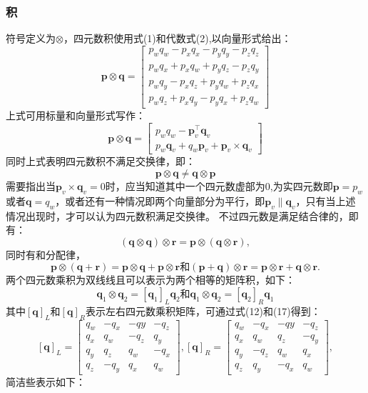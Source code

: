 \documentclass{article}
\begin{document}
\subsubsection{积}
符号定义为$\otimes$，四元数积使用式(1)和代数式(2),以向量形式给出：
$$
\textbf{p}\otimes \textbf{q} = \begin{bmatrix}p_wq_w-p_xq_x-p_yq_y-p_zq_z\\p_wq_x+p_xq_w+p_yq_z-p_zq_y\\
p_wq_y-p_xq_z+p_yq_w+p_zq_x\\
p_wq_z+p_xq_y-p_yq_x+p_zq_w\end{bmatrix}
$$上式可用标量和向量形式写作：
$$
\textbf{p}\otimes\textbf{q} = \begin{bmatrix}
p_wq_w-\textbf{p}_{v}^{\top}\textbf{q}_v\\
p_w\textbf{q}_v+q_w\textbf{p}_v+\textbf{p}_v\times\textbf{q}_v\end{bmatrix}
$$同时上式表明四元数积不满足交换律，即：
$$
\textbf{p}\otimes\textbf{q}\neq\textbf{q}\otimes\textbf{p}  
$$
需要指出当$\textbf{p}_v\times\textbf{q}_v=0$时，应当知道其中一个四元数虚部为0,为实四元数即$\textbf{p}=p_w$或者$\textbf{q}=q_w$，或者还有一种情况即两个向量部分为平行，即$\textbf{p}_v\parallel\textbf{q}_v$，只有当上述情况出现时，才可以认为四元数积满足交换律。
不过四元数是满足结合律的，即有：
$$
(\textbf{q}\otimes\textbf{q})\otimes\textbf{r}=\textbf{p}\otimes(\textbf{q}\otimes\textbf{r}),
$$同时有和分配律，
$$
\textbf{p}\otimes(\textbf{q}+\textbf{r}) = \textbf{p}\otimes\textbf{q}+\textbf{p}\otimes\textbf{r} 和 
(\textbf{p}+\textbf{q})\otimes\textbf{r} = \textbf{p}\otimes\textbf{r}+\textbf{q}\otimes\textbf{r}.
$$两个四元数乘积为双线线且可以表示为两个相等的矩阵积，如下：
$$
\textbf{q}_1\otimes\textbf{q}_2 = \left [ \textbf{q}_1\right ] _{L}\textbf{q}_2 和 \textbf{q}_1\otimes\textbf{q}_2 = \left [ \textbf{q}_2\right ] _{R}\textbf{q}_1
$$其中$\left[\textbf{q} \right ] _{L}$和$\left[\textbf{q} \right ] _{R}$表示左右四元数乘积矩阵，可通过式(12)和(17)得到：
$$
\left[\textbf{q} \right ] _{L} = \begin{bmatrix}
q_w&-q_x&-qy&-q_z\\q_x&q_w&-q_z&q_y\\
q_y&q_z&q_w&-q_x\\q_z&-q_y&q_x&q_w\end{bmatrix}, 
\left[\textbf{q} \right ] _{R} = \begin{bmatrix}
q_w&-q_x&-qy&-q_z\\q_x&q_w&q_z&-q_y\\
q_y&-q_z&q_w&q_x\\q_z&q_y&-q_x&q_w\end{bmatrix}, 
$$简洁些表示如下：
\end{document}
